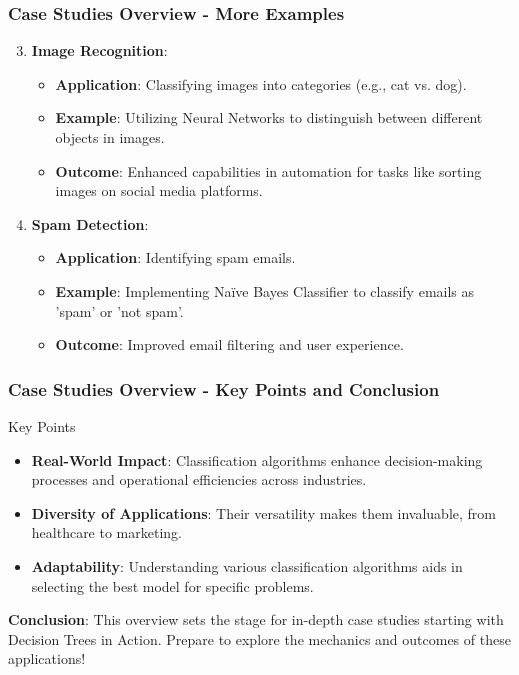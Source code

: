 \documentclass{beamer}
\begin{document}
\begin{frame}[fragile]
    \frametitle{Case Studies Overview - More Examples}
    
    \begin{enumerate}
        \setcounter{enumi}{2} %
        \item \textbf{Image Recognition}:
            \begin{itemize}
                \item \textbf{Application}: Classifying images into categories (e.g., cat vs. dog).
                \item \textbf{Example}: Utilizing Neural Networks to distinguish between different objects in images.
                \item \textbf{Outcome}: Enhanced capabilities in automation for tasks like sorting images on social media platforms.
            \end{itemize}
            
        \item \textbf{Spam Detection}:
            \begin{itemize}
                \item \textbf{Application}: Identifying spam emails.
                \item \textbf{Example}: Implementing Naïve Bayes Classifier to classify emails as 'spam' or 'not spam'.
                \item \textbf{Outcome}: Improved email filtering and user experience.
            \end{itemize}
    \end{enumerate}
\end{frame}

\begin{frame}[fragile]
    \frametitle{Case Studies Overview - Key Points and Conclusion}

    \begin{block}{Key Points}
        \begin{itemize}
            \item \textbf{Real-World Impact}: Classification algorithms enhance decision-making processes and operational efficiencies across industries.
            \item \textbf{Diversity of Applications}: Their versatility makes them invaluable, from healthcare to marketing.
            \item \textbf{Adaptability}: Understanding various classification algorithms aids in selecting the best model for specific problems.
        \end{itemize}
    \end{block}

    \textbf{Conclusion}: This overview sets the stage for in-depth case studies starting with Decision Trees in Action. Prepare to explore the mechanics and outcomes of these applications!
\end{frame}
\end{document}
